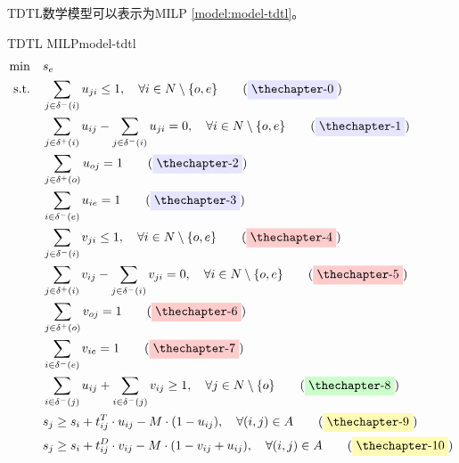 TDTL数学模型可以表示为MILP \ref{model:model-tdtl}。

{
\newcommand{\myYellowTag}[1]{\label{#1}\tag{\colorbox{shallow-yellow}{\theequation}}\addtocounter{equation}{1}}
\newcommand{\myRedTag}[1]{\label{#1}\tag{\colorbox{shallow-red}{\theequation}}\addtocounter{equation}{1}}
\newcommand{\myGreenTag}[1]{\label{#1}\tag{\colorbox{shallow-green}{\theequation}}\addtocounter{equation}{1}}
\newcommand{\myPurpleTag}[1]{\label{#1}\tag{\colorbox{shallow-purple}{\theequation}}\addtocounter{equation}{1}}
\newcommand{\myBlueTag}[1]{\label{#1}\tag{\colorbox{shallow-blue}{\theequation}}\addtocounter{equation}{1}}

\begin{model}{TDTL MILP}{model-tdtl}
\begin{align}
    \min \quad & s_{e} \label{eq:tdtl-obj}\\
    \text{s.t.} \quad & \sum_{j \in \delta^{-}(i)} u_{ji} \leq 1, \quad \forall i \in N \setminus \{o, e\} \myPurpleTag{eq:tdtl-truck-visit-limit}\\
    & \sum_{j \in \delta^{+}(i)} u_{ij} - \sum_{j \in \delta^{-}(i)} u_{ji} = 0, \quad \forall i \in N \setminus \{o, e\} \myPurpleTag{eq:tdtl-truck-flow-balance}\\
    & \sum_{j \in \delta^{+}(o)} u_{oj} = 1 \myPurpleTag{eq:tdtl-truck-start}\\
    & \sum_{i \in \delta^{-}(e)} u_{ie} = 1 \myPurpleTag{eq:tdtl-truck-end}\\
    & \sum_{j \in \delta^{-}(i)} v_{ji} \leq 1, \quad \forall i \in N \setminus \{o, e\} \myRedTag{eq:tdtl-drone-visit-limit}\\
    & \sum_{j \in \delta^{+}(i)} v_{ij} - \sum_{j \in \delta^{-}(i)} v_{ji} = 0, \quad \forall i \in N \setminus \{o, e\} \myRedTag{eq:tdtl-drone-flow-balance}\\
    & \sum_{j \in \delta^{+}(o)} v_{oj} = 1 \myRedTag{eq:tdtl-drone-start}\\
    & \sum_{i \in \delta^{-}(e)} v_{ie} = 1 \myRedTag{eq:tdtl-drone-end}\\
    & \sum_{i \in \delta^{-}(j)} u_{ij} + \sum_{i \in \delta^{-}(j)} v_{ij} \geq 1, \quad \forall j \in N \setminus \{o\} \myGreenTag{eq:tdtl-visit-either}\\
    & s_{j} \geq s_{i} + t_{ij}^{T} \cdot u_{ij} - M \cdot (1 - u_{ij}), \quad \forall (i, j) \in A \myYellowTag{eq:tdtl-truck-time}\\
    & s_{j} \geq s_{i} + t_{ij}^{D} \cdot v_{ij} - M \cdot (1 - v_{ij} + u_{ij}), \quad \forall (i, j) \in A \myYellowTag{eq:tdtl-drone-time}\\

\end{align}
\end{model}}
